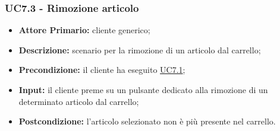 \subsubsection{UC7.3 - Rimozione articolo}
\label{UC7.3}
\begin{itemize}
    \item \textbf{Attore Primario:} cliente generico;
    \item \textbf{Descrizione:} scenario per la rimozione di un articolo dal carrello;
    \item \textbf{Precondizione:} il cliente ha eseguito \hyperref[UC7.1]{UC7.1};
    \item \textbf{Input:} il cliente preme su un pulsante dedicato alla rimozione di un determinato articolo dal carrello;
    \item \textbf{Postcondizione:} l'articolo selezionato non è più presente nel carrello.
\end{itemize}

